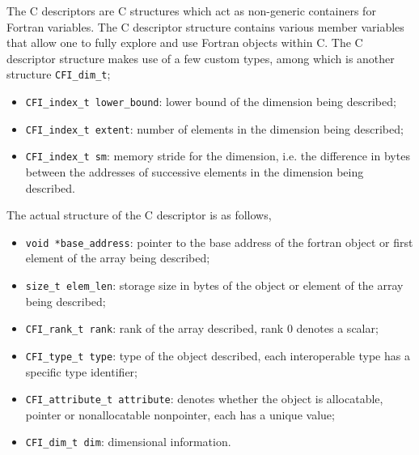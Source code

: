 The C descriptors are C structures which act as non-generic containers for Fortran variables. The C descriptor structure contains various member variables that allow one to fully explore and use Fortran objects within C. The C descriptor structure makes use of a few custom types, among which is another structure \texttt{CFI\_dim\_t};
\begin{itemize}
    \item \texttt{CFI\_index\_t lower\_bound}: lower bound of the dimension being described;
    \item \texttt{CFI\_index\_t extent}: number of elements in the dimension being described;
    \item \texttt{CFI\_index\_t sm}: memory stride for the dimension, i.e. the difference in bytes between the addresses of successive elements in the dimension being described.
\end{itemize}
The actual structure of the C descriptor is as follows,
\begin{itemize}
    \item \texttt{void *base\_address}: pointer to the base address of the fortran object or first element of the array being described;
    \item \texttt{size\_t elem\_len}: storage size in bytes of the object or element of the array being described;
    \item \texttt{CFI\_rank\_t rank}: rank of the array described, rank 0 denotes a scalar;
    \item \texttt{CFI\_type\_t type}:  type of the object described, each interoperable type has a specific type identifier;
    \item \texttt{CFI\_attribute\_t attribute}: denotes whether the object is allocatable, pointer or nonallocatable nonpointer, each has a unique value;
    \item \texttt{CFI\_dim\_t dim}: dimensional information.
\end{itemize}

